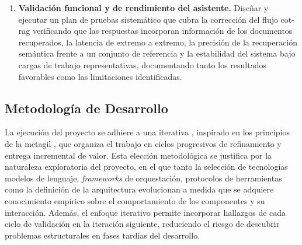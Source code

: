 \begin{enumerate}
    \item \textbf{Validación funcional y de rendimiento del asistente.} Diseñar y ejecutar un plan de pruebas sistemático que cubra la corrección del flujo \gls{cot}-\gls{rag} verificando que las respuestas incorporan información de los documentos recuperados, la latencia de extremo a extremo, la precisión de la recuperación semántica frente a un conjunto de referencia y la estabilidad del sistema bajo cargas de trabajo representativas, documentando tanto los resultados favorables como las limitaciones identificadas.
\end{enumerate}

\subsection{Metodología de Desarrollo}
\label{subsec:metodologia}

La ejecución del proyecto se adhiere a una \gls{iterativa} \cite{larmanIterativeIncrementalDevelopments2003}, inspirado en los principios de la \gls{metagil} \cite{ilievaAnalysesAgileMethodology2004}, que organiza el trabajo en ciclos progresivos de refinamiento y entrega incremental de valor. Esta elección metodológica se justifica por la naturaleza exploratoria del proyecto, en el que tanto la selección de tecnologías modelos de lenguaje, \textit{frameworks} de orquestación, protocolos de herramientas como la definición de la arquitectura evolucionan a medida que se adquiere conocimiento empírico sobre el comportamiento de los componentes y su interacción. Además, el enfoque iterativo permite incorporar hallazgos de cada ciclo de validación en la iteración siguiente, reduciendo el riesgo de descubrir problemas estructurales en fases tardías del desarrollo.

